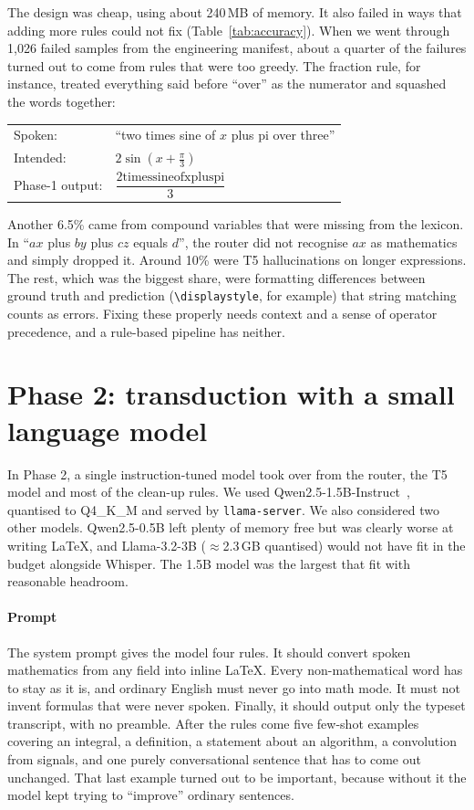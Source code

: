 \documentclass[11pt,a4paper,oneside]{report}
\theoremstyle{definition}
\begin{document}
The design was cheap, using about 240\,MB of memory. It also failed in ways that adding more rules could not fix (Table~\ref{tab:accuracy}). When we went through 1{,}026 failed samples from the engineering manifest, about a quarter of the failures turned out to come from rules that were too greedy. The fraction rule, for instance, treated everything said before ``over'' as the numerator and squashed the words together:
\begin{center}\small
\begin{tabular}{@{}ll@{}}
Spoken: & ``two times sine of $x$ plus pi over three'' \\
Intended: & $2\sin\!\left(x + \frac{\pi}{3}\right)$ \\[2pt]
Phase-1 output: & $\dfrac{\mathrm{2timessineofxpluspi}}{3}$ \\
\end{tabular}
\end{center}
Another 6.5\% came from compound variables that were missing from the lexicon. In ``$ax$ plus $by$ plus $cz$ equals $d$'', the router did not recognise $ax$ as mathematics and simply dropped it. Around 10\% were T5 hallucinations on longer expressions. The rest, which was the biggest share, were formatting differences between ground truth and prediction (\verb|\displaystyle|, for example) that string matching counts as errors. Fixing these properly needs context and a sense of operator precedence, and a rule-based pipeline has neither.

\section{Phase 2: transduction with a small language model}
\label{sec:slm}
In Phase 2, a single instruction-tuned model took over from the router, the T5 model and most of the clean-up rules. We used Qwen2.5-1.5B-Instruct~\cite{qwen2025report}, quantised to Q4\_K\_M and served by \texttt{llama-server}. We also considered two other models. Qwen2.5-0.5B left plenty of memory free but was clearly worse at writing LaTeX, and Llama-3.2-3B ($\approx$2.3\,GB quantised) would not have fit in the budget alongside Whisper. The 1.5B model was the largest that fit with reasonable headroom.

\paragraph{Prompt} The system prompt gives the model four rules. It should convert spoken mathematics from any field into inline LaTeX. Every non-mathematical word has to stay as it is, and ordinary English must never go into math mode. It must not invent formulas that were never spoken. Finally, it should output only the typeset transcript, with no preamble. After the rules come five few-shot examples covering an integral, a definition, a statement about an algorithm, a convolution from signals, and one purely conversational sentence that has to come out unchanged. That last example turned out to be important, because without it the model kept trying to ``improve'' ordinary sentences.
\end{document}
